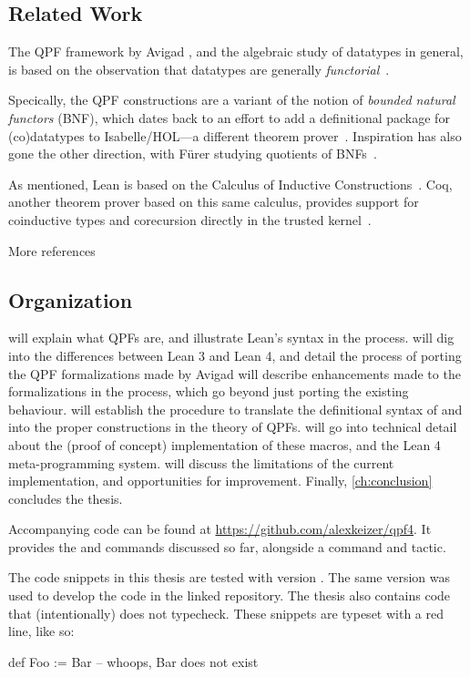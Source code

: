 \subsection*{Related Work}
The QPF framework by Avigad \etal{}, and the algebraic study of datatypes in general, is based on the observation that datatypes are generally \emph{functorial}~\cite{avigadDataTypesQuotients2019a}.

Specically, the QPF constructions are a variant of the notion of \emph{bounded natural functors} (BNF), 
which dates back to an effort to add a definitional package for (co)datatypes to Isabelle/HOL---a different theorem prover~\cite{biendarraDefiningCoDatatypes,traytelCategoryTheoryBased}.
Inspiration has also gone the other direction, with F\"urer \etal{} studying quotients of BNFs~\cite{furerQuotientsBoundedNatural2022}.

As mentioned, Lean is based on the Calculus of Inductive Constructions~\cite{coquandMetamathematicalInvestigationsCalculus1989}.
Coq, another theorem prover based on this same calculus, provides support
for coinductive types and corecursion directly in the trusted kernel~\cite{gimenezApplicationCoinductiveTypes1996,gimenezTutorialRecursiveTypes1998}.


\begin{todo}
    More references
\end{todo}


\subsection*{Organization}
 will explain what QPFs are, and illustrate Lean's syntax in the process.
 will dig into the differences between Lean 3 and Lean 4, and detail the process of porting the QPF formalizations made by Avigad \etal
{} will describe enhancements made to the formalizations in the process, which go beyond just porting the existing behaviour.
 will establish the procedure to translate the definitional syntax of \data{} and \codata{} into the proper constructions in the theory of QPFs.
 will go into technical detail about the (proof of concept)
implementation of these macros, and the Lean 4 meta-programming system.
 will discuss the limitations of the current implementation, and opportunities for improvement.
Finally, \cref{ch:conclusion} concludes the thesis.

Accompanying code can be found at \url{https://github.com/alexkeizer/qpf4}.
It provides the \data{} and \codata{} commands discussed so far, alongside a  command and  tactic.

The code snippets in this thesis are tested with version . The same version was used to develop the code in the linked repository.
The thesis also contains code that (intentionally) does not typecheck. These snippets are typeset with a red line, like so:
\begin{badleancode}

    def Foo := Bar -- whoops, Bar does not exist

\end{badleancode}